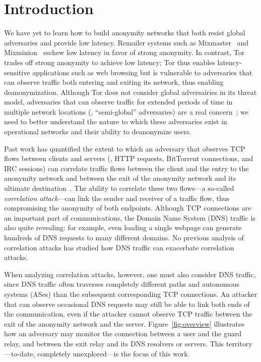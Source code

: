 \section{Introduction}
\label{sec:introduction}

We have yet to learn how to build anonymity networks that both
resist global adversaries and provide low latency.  Remailer systems
such as Mixmaster~\cite{mixmaster} and
Mixminion~\cite{danezis2003mixminion} eschew low latency in favor of
strong anonymity.
In contrast, Tor~\cite{dingledine04tor} trades off strong anonymity to
achieve low latency; Tor thus
enables latency-sensitive applications such as web browsing but is
vulnerable to
adversaries that can observe traffic both
entering and exiting its network, thus enabling deanonymization.
Although Tor does not consider global adversairies in its threat model,
adversaries that can observe traffic for extended periods of time in
multiple network locations (\ie, ``semi-global'' adversaries) are a real
concern~\cite{Farrell2014a,Johnson2013a}; we need to better understand
the nature to which these adversaries exist in operational networks and
their ability to deanonymize users.

Past work has quantified the extent to which an adversary that
observes TCP flows between clients and servers (\eg, HTTP requests,
BitTorrent connections, and IRC sessions) can correlate traffic flows
between the client and the entry to the anonymity network and between
the exit of the anonymity network and its ultimate
destination~\cite{Johnson2013a,Murdoch2007a}. The ability to correlate
these two flows---a so-called {\em correlation attack}---can link the
sender and receiver of a traffic flow, thus compromising the anonymity
of both endpoints. Although TCP connections are an important part
of communications, the Domain Name System (DNS) traffic is also
quite revealing: for example, even loading a single webpage can generate
hundreds of DNS requests to many different domains. No previous analysis
of correlation attacks has studied how DNS traffic can exacerbate
correlation attacks.

When analyzing correlation attacks, however, one must also consider DNS
traffic, since DNS traffic often traverses completely different paths
and autonomous systems (ASes) than the subsequent corresponding TCP
connections.  An attacker that can observe occasional DNS
requests may still be able to link both ends of the communication, even
if the attacker cannot observe TCP traffic between the exit of the
anonymity network and the server.
Figure~\ref{fig:overview} illustrates how an adversary may
monitor the connection between a user and the guard relay, and between the exit
relay and its DNS resolvers or servers.  This
territory---to-date, completely unexplored---is the focus of this work.

